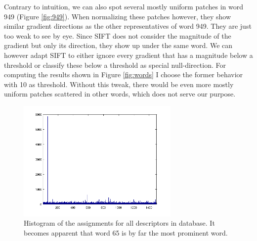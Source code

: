 \documentclass{paper}
\begin{document}
Contrary to intuition, we can also spot several mostly uniform patches in word 949
(Figure \ref{fig:949}). When normalizing these patches however, they show similar 
gradient directions as the other representatives of word 949. They are just too weak to see
by eye. Since SIFT does not consider the magnitude of the gradient but only its direction,
they show up under the same word. We can however adapt SIFT to either ignore every 
gradient that has a magnitude below a threshold or classify these below a threshold as 
special null-direction. For computing the results shown in Figure \ref{fig:words} I 
choose the former behavior with 10 as threshold. 
Without this tweak, there would be even more mostly uniform patches scattered in other words,
which does not serve our purpose.
\begin{figure}
  \centering
  \includegraphics[width=0.7\textwidth]{hist_all}
  \caption{Histogram of the assignments for all descriptors in database. It becomes 
  apparent that word 65 is by far the most prominent word.}
  \label{fig:all_hist}
\end{figure}
\end{document}
